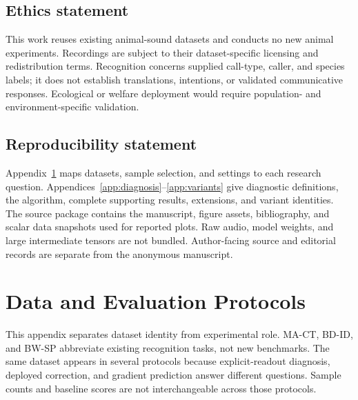 \documentclass{article}
\begin{document}
\subsection*{Ethics statement}
This work reuses existing animal-sound datasets and conducts no new animal experiments. Recordings are subject to their dataset-specific licensing and redistribution terms. Recognition concerns supplied call-type, caller, and species labels; it does not establish translations, intentions, or validated communicative responses. Ecological or welfare deployment would require population- and environment-specific validation.

\subsection*{Reproducibility statement}
Appendix~\ref{app:protocols} maps datasets, sample selection, and settings to each research question. Appendices~\ref{app:diagnosis}--\ref{app:variants} give diagnostic definitions, the algorithm, complete supporting results, extensions, and variant identities. The source package contains the manuscript, figure assets, bibliography, and scalar data snapshots used for reported plots. Raw audio, model weights, and large intermediate tensors are not bundled. Author-facing source and editorial records are separate from the anonymous manuscript.

\begingroup
\small


\endgroup
\clearpage
\appendix

\section{Data and Evaluation Protocols}
\label{app:protocols}
\label{app:tasks}
This appendix separates dataset identity from experimental role. MA-CT, BD-ID, and BW-SP abbreviate existing recognition tasks, not new benchmarks. The same dataset appears in several protocols because explicit-readout diagnosis, deployed correction, and gradient prediction answer different questions. Sample counts and baseline scores are not interchangeable across those protocols.
\end{document}
